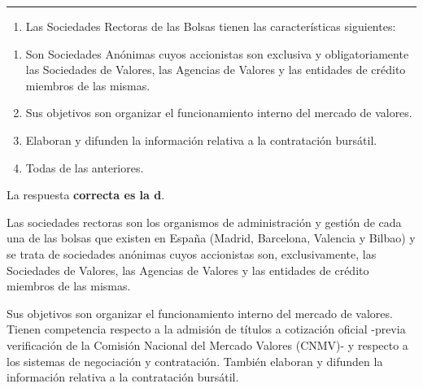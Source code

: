\documentclass[
  letterpaper,
  DIV=11,
  numbers=noendperiod]{scrreprt}
\providecommand{\tightlist}{%
  \setlength{\itemsep}{0pt}\setlength{\parskip}{0pt}}\usepackage{longtable,booktabs,array}
\begin{document}
\begin{center}\rule{0.5\linewidth}{0.5pt}\end{center}

\begin{enumerate}
\def\labelenumi{\arabic{enumi}.}
\setcounter{enumi}{2}
\tightlist
\item
  Las Sociedades Rectoras de las Bolsas tienen las características
  siguientes:
\end{enumerate}

\begin{enumerate}
\def\labelenumi{\alph{enumi})}
\item
  Son Sociedades Anónimas cuyos accionistas son exclusiva y
  obligatoriamente las Sociedades de Valores, las Agencias de Valores y
  las entidades de crédito miembros de las mismas.
\item
  Sus objetivos son organizar el funcionamiento interno del mercado de
  valores.
\item
  Elaboran y difunden la información relativa a la contratación
  bursátil.
\item
  Todas de las anteriores.
\end{enumerate}

\begin{tcolorbox}[enhanced jigsaw, left=2mm, opacityback=0, colback=white, breakable, arc=.35mm, bottomrule=.15mm, rightrule=.15mm, toprule=.15mm, leftrule=.75mm, colframe=quarto-callout-tip-color-frame]
\begin{minipage}[t]{5.5mm}
\textcolor{quarto-callout-tip-color}{\faLightbulb}
\end{minipage}%
\begin{minipage}[t]{\textwidth - 5.5mm}

La respuesta \textbf{correcta es la d}.

Las sociedades rectoras son los organismos de administración y gestión
de cada una de las bolsas que existen en España (Madrid, Barcelona,
Valencia y Bilbao) y se trata de sociedades anónimas cuyos accionistas
son, exclusivamente, las Sociedades de Valores, las Agencias de Valores
y las entidades de crédito miembros de las mismas.

Sus objetivos son organizar el funcionamiento interno del mercado de
valores. Tienen competencia respecto a la admisión de títulos a
cotización oficial -previa verificación de la Comisión Nacional del
Mercado Valores (CNMV)- y respecto a los sistemas de negociación y
contratación. También elaboran y difunden la información relativa a la
contratación bursátil.

\end{minipage}%
\end{tcolorbox}
\end{document}
